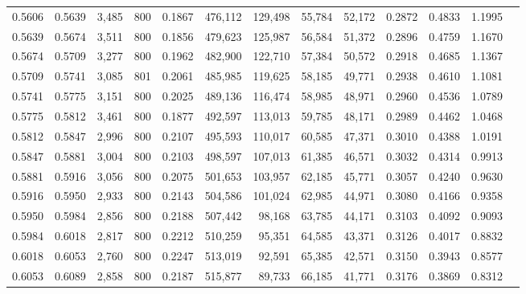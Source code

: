 \begin{tabular}{rrrrrrrrrrrrr}
0.5606 & 0.5639 &  3,485 & 800 &                                     0.1867 & 476,112 & 129,498 &  55,784 &  52,172 & 0.2872 & 0.4833 & 1.1995 \\
0.5639 & 0.5674 &  3,511 & 800 &                                     0.1856 & 479,623 & 125,987 &  56,584 &  51,372 & 0.2896 & 0.4759 & 1.1670 \\
0.5674 & 0.5709 &  3,277 & 800 &                                     0.1962 & 482,900 & 122,710 &  57,384 &  50,572 & 0.2918 & 0.4685 & 1.1367 \\
0.5709 & 0.5741 &  3,085 & 801 &                                     0.2061 & 485,985 & 119,625 &  58,185 &  49,771 & 0.2938 & 0.4610 & 1.1081 \\
0.5741 & 0.5775 &  3,151 & 800 &                                     0.2025 & 489,136 & 116,474 &  58,985 &  48,971 & 0.2960 & 0.4536 & 1.0789 \\
0.5775 & 0.5812 &  3,461 & 800 &                                     0.1877 & 492,597 & 113,013 &  59,785 &  48,171 & 0.2989 & 0.4462 & 1.0468 \\
0.5812 & 0.5847 &  2,996 & 800 &                                     0.2107 & 495,593 & 110,017 &  60,585 &  47,371 & 0.3010 & 0.4388 & 1.0191 \\
0.5847 & 0.5881 &  3,004 & 800 &                                     0.2103 & 498,597 & 107,013 &  61,385 &  46,571 & 0.3032 & 0.4314 & 0.9913 \\
0.5881 & 0.5916 &  3,056 & 800 &                                     0.2075 & 501,653 & 103,957 &  62,185 &  45,771 & 0.3057 & 0.4240 & 0.9630 \\
0.5916 & 0.5950 &  2,933 & 800 &                                     0.2143 & 504,586 & 101,024 &  62,985 &  44,971 & 0.3080 & 0.4166 & 0.9358 \\
0.5950 & 0.5984 &  2,856 & 800 &                                     0.2188 & 507,442 &  98,168 &  63,785 &  44,171 & 0.3103 & 0.4092 & 0.9093 \\
0.5984 & 0.6018 &  2,817 & 800 &                                     0.2212 & 510,259 &  95,351 &  64,585 &  43,371 & 0.3126 & 0.4017 & 0.8832 \\
0.6018 & 0.6053 &  2,760 & 800 &                                     0.2247 & 513,019 &  92,591 &  65,385 &  42,571 & 0.3150 & 0.3943 & 0.8577 \\
0.6053 & 0.6089 &  2,858 & 800 &                                     0.2187 & 515,877 &  89,733 &  66,185 &  41,771 & 0.3176 & 0.3869 & 0.8312 \\

\end{tabular}
